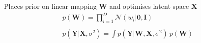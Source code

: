\documentclass[10pt]{beamer}
\begin{document}
\begin{frame}
\begin{columns}
\begin{column}[t]{0.48\textwidth}
\begin{figure}
      \end{figure}
      Places prior on linear mapping $\mathbf{W}$ and optimises latent space $\mathbf{X}$
      \begin{equation*}
        \begin{array}{c}
          p(\mathbf{W}) = \prod_{i=1}^D \mathcal{N}(w_i|\mathbf{0},\mathbf{I})\\~\\
          p(\mathbf{Y}|\mathbf{X},\sigma^2) = \int p(\mathbf{Y}|\mathbf{W},\mathbf{X},\sigma^2)~p(\mathbf{W})
        \end{array}
      \end{equation*}
    \end{column}
  \end{columns}

  \end{frame}
\end{document}
